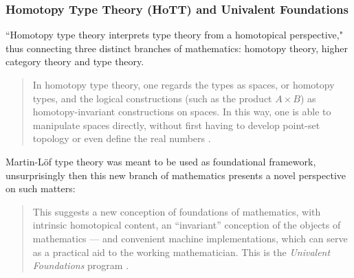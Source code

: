 \documentclass[12p]{article}
\theoremstyle{definition}
\begin{document}
\subsubsection{Homotopy Type Theory (HoTT) and Univalent Foundations}
``Homotopy type theory interprets type theory from a homotopical perspective," thus connecting three distinct branches of mathematics: homotopy theory, higher category theory and type theory.

\begin{quote}
In homotopy type theory, one regards the types as spaces, or homotopy types, and the logical constructions (such as the product $A \times B$)  as  homotopy-invariant  constructions  on spaces.  In  this  way,  one  is  able  to  manipulate spaces directly, without first having to develop point-set topology or even define the real numbers \cite{awodey2013voevodsky}.
\end{quote}
Martin-Löf type theory was meant to be used as foundational framework, unsurprisingly then this new branch of mathematics presents a novel perspective on such matters:
\begin{quote}
	This suggests a new conception of foundations of mathematics, with intrinsic homotopical
	content,  an  ``invariant”  conception  of  the  objects  of  mathematics ---  and  convenient  machine
	implementations, which can serve as a practical aid to the working mathematician.  This is the
	\textit{Univalent Foundations} program \cite{hottbook}.
\end{quote}
\newpage


\end{document}
